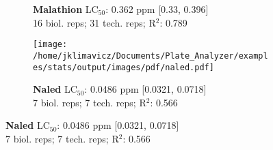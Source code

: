 \documentclass{article}
\begin{document}
\begin{figure}[thp!]
\begin{subfigure}{0.500\textwidth}
      \vspace{-0.05cm}
      \caption*{\textbf{Malathion} LC$_{50}$: 0.362 ppm [0.33, 0.396] \\ 
16 biol. reps; 31 tech. reps; R$^2$: 0.789}
      \vspace{0.1cm}
   \end{subfigure}%
   \begin{subfigure}{0.500\textwidth}
      \centering
      \texttt{[image: /home/jklimavicz/Documents/Plate\_Analyzer/examples/stats/output/images/pdf/naled.pdf]}
      \vspace{-0.05cm}
      \caption*{\textbf{Naled} LC$_{50}$: 0.0486 ppm [0.0321, 0.0718] \\ 
7 biol. reps; 7 tech. reps; R$^2$: 0.566}
      \vspace{0.1cm}
   \end{subfigure}%
\end{figure}
\clearpage
\pagebreak
\vspace{-0.1cm}
\end{document}
